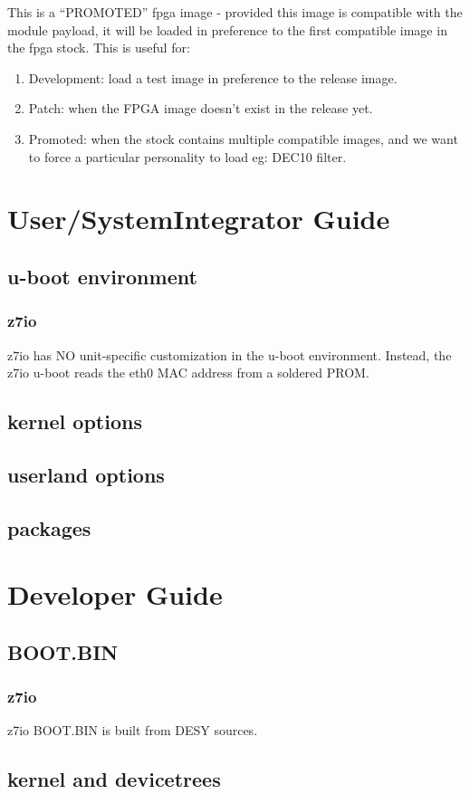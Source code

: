 \documentclass[]{article}
\begin{document}
This is a “PROMOTED” fpga image - provided this image is compatible with the module payload, it will be loaded in preference to the first compatible image in the fpga stock. This is useful for:
\begin{enumerate}
    \item Development: load a test image in preference to the release image.
    \item Patch: when the FPGA image doesn’t exist in the release yet.
    \item Promoted: when the stock contains multiple compatible images, and we want to force a particular personality to load eg: DEC10 filter.
\end{enumerate}

\section{User/SystemIntegrator Guide}

\subsection{u-boot environment}

\subsubsection{z7io}
z7io has NO unit-specific customization in the u-boot environment. Instead, the z7io u-boot reads the eth0 MAC address from a soldered PROM.

\subsection{kernel options}


\subsection{userland options}

\subsection{packages}

\section{Developer Guide}

\subsection{BOOT.BIN}

\subsubsection{z7io}
z7io BOOT.BIN is built from DESY sources.

\subsection{kernel and devicetrees}
\end{document}
